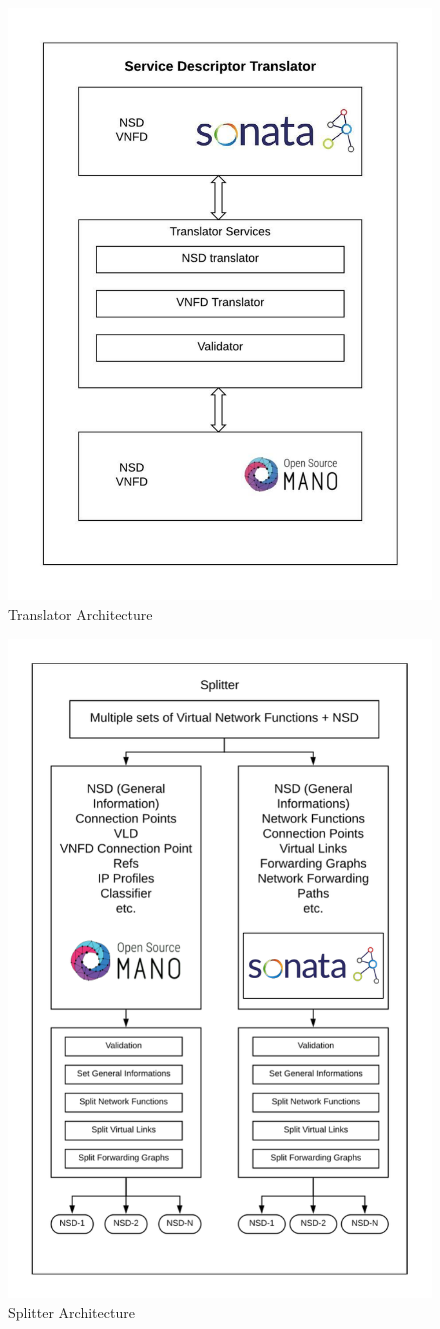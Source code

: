 \begin{frame}

\begin{figure}
	\centering
	\includegraphics[width=0.56\linewidth]{images/ServiceDescriptorTranslator}
	{\\Translator Architecture}
	\label{fig:servicedescriptortranslator}
\end{figure}

\end{frame}
%
%
\begin{frame}

\begin{figure}
	\centering
	\includegraphics[width=0.5\linewidth]{images/splitter}
	{\\Splitter Architecture}
	\label{fig:splitter}
\end{figure}

\end{frame}

